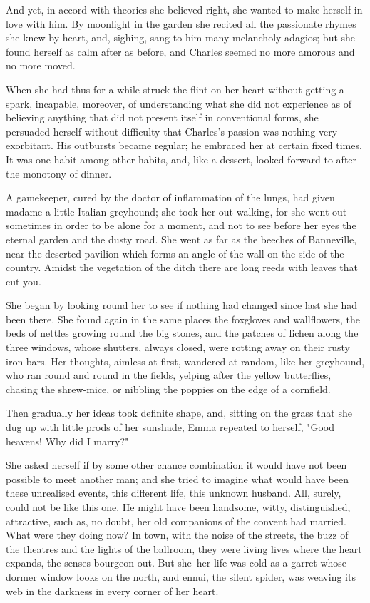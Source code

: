 \documentclass{tufte-book}
\begin{document}
And yet, in accord with theories she believed right, she wanted to make
herself in love with him. By moonlight in the garden she recited all
the passionate rhymes she knew by heart, and, sighing, sang to him many
melancholy adagios; but she found herself as calm after as before, and
Charles seemed no more amorous and no more moved.

When she had thus for a while struck the flint on her heart without
getting a spark, incapable, moreover, of understanding what she did
not experience as of believing anything that did not present itself
in conventional forms, she persuaded herself without difficulty that
Charles's passion was nothing very exorbitant. His outbursts became
regular; he embraced her at certain fixed times. It was one habit among
other habits, and, like a dessert, looked forward to after the monotony
of dinner.

A gamekeeper, cured by the doctor of inflammation of the lungs, had
given madame a little Italian greyhound; she took her out walking, for
she went out sometimes in order to be alone for a moment, and not to see
before her eyes the eternal garden and the dusty road. She went as far
as the beeches of Banneville, near the deserted pavilion which forms an
angle of the wall on the side of the country. Amidst the vegetation of
the ditch there are long reeds with leaves that cut you.

She began by looking round her to see if nothing had changed since last
she had been there. She found again in the same places the foxgloves and
wallflowers, the beds of nettles growing round the big stones, and
the patches of lichen along the three windows, whose shutters, always
closed, were rotting away on their rusty iron bars. Her thoughts,
aimless at first, wandered at random, like her greyhound, who ran round
and round in the fields, yelping after the yellow butterflies, chasing
the shrew-mice, or nibbling the poppies on the edge of a cornfield.

Then gradually her ideas took definite shape, and, sitting on the grass
that she dug up with little prods of her sunshade, Emma repeated to
herself, "Good heavens! Why did I marry?"

She asked herself if by some other chance combination it would have not
been possible to meet another man; and she tried to imagine what would
have been these unrealised events, this different life, this unknown
husband. All, surely, could not be like this one. He might have been
handsome, witty, distinguished, attractive, such as, no doubt, her old
companions of the convent had married. What were they doing now? In
town, with the noise of the streets, the buzz of the theatres and the
lights of the ballroom, they were living lives where the heart expands,
the senses bourgeon out. But she--her life was cold as a garret whose
dormer window looks on the north, and ennui, the silent spider, was
weaving its web in the darkness in every corner of her heart.
\end{document}
